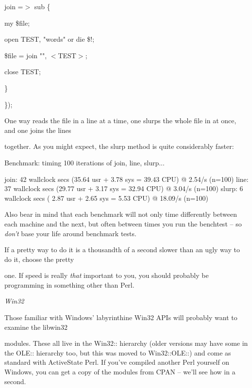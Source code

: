 \documentclass[a4paper,11pt]{book}
\begin{document}
\noindent 

\noindent join =$>$ sub \{

\noindent my \$file;

\noindent open TEST, "words" or die \$!;

\noindent \$file = join "", $<$TEST$>$;

\noindent close TEST;

\noindent \}

\noindent \});

\noindent 

\noindent One way reads the file in a line at a time, one slurps the whole file in at once, and one joins the lines

\noindent together. As you might expect, the slurp method is quite considerably faster:

\noindent 

\noindent Benchmark: timing 100 iterations of join, line, slurp...

\noindent join: 42 wallclock secs (35.64 usr +  3.78 sys = 39.43 CPU) @  2.54/s (n=100) line: 37 wallclock secs (29.77 usr +  3.17 sys = 32.94 CPU) @  3.04/s (n=100) slurp:  6 wallclock secs ( 2.87 usr +  2.65 sys =  5.53 CPU) @ 18.09/s (n=100)

\noindent 

\noindent Also bear in mind that each benchmark will not only time differently between each machine and the next, but often between times you run the benchtest -- so \textit{don't }base your life around benchmark tests.

\noindent If a pretty way to do it is a thousandth of a second slower than an ugly way to do it, choose the pretty

\noindent one. If speed is really \textit{that }important to you, you should probably be programming in something other than Perl.

\noindent 

\noindent \textit{Win32}

\noindent Those familiar with Windows' labyrinthine Win32 APIs will probably want to examine the libwin32

\noindent modules. These all live in the Win32:: hierarchy (older versions may have some in the OLE:: hierarchy too, but this was moved to Win32::OLE::) and come as standard with ActiveState Perl. If you've compiled another Perl yourself on Windows, you can get a copy of the modules from CPAN -- we'll see how in a second.

\noindent 
\end{document}
